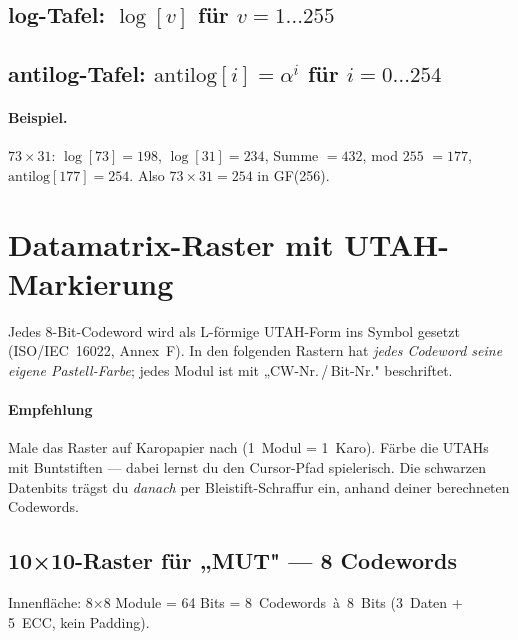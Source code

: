 \subsection*{log-Tafel: $\log[v]$ für $v = 1 \dots 255$}



\subsection*{antilog-Tafel: $\text{antilog}[i] = \alpha^i$ für $i = 0 \dots 254$}



\bigskip
\paragraph{Beispiel.}
$73 \times 31$:
$\log[73] = 198$, $\log[31] = 234$, Summe $= 432$, mod $255$ $= 177$,
$\text{antilog}[177] = 254$. Also $73 \times 31 = 254$ in GF(256).

\clearpage

\section*{Datamatrix-Raster mit UTAH-Markierung}

Jedes 8-Bit-Codeword wird als L-förmige UTAH-Form ins Symbol gesetzt
(ISO/IEC~16022, Annex~F). In den folgenden Rastern hat \emph{jedes
Codeword seine eigene Pastell-Farbe}; jedes Modul ist mit
„CW-Nr.\,/\,Bit-Nr." beschriftet.

\paragraph{Empfehlung} Male das Raster auf Karopapier nach
(1~Modul = 1~Karo). Färbe die UTAHs mit Buntstiften — dabei lernst du
den Cursor-Pfad spielerisch. Die schwarzen Datenbits trägst du
\emph{danach} per Bleistift-Schraffur ein, anhand deiner berechneten
Codewords.

\subsection*{10×10-Raster für „MUT" — 8 Codewords}

Innenfläche: 8×8 Module = 64 Bits = 8~Codewords~à~8~Bits (3~Daten +
5~ECC, kein Padding).

